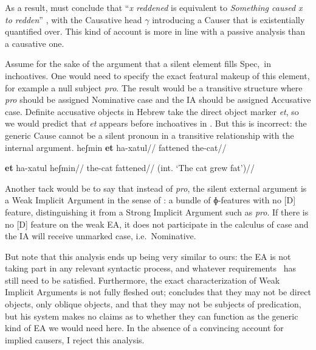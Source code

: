 As a result, \citeauthor{doron03} must conclude that ``\emph{x reddened} is equivalent to \emph{Something caused x to redden}'' \citep[62]{doron03}, with the Causative head $\gamma$ introducing a Causer that is existentially quantified over. This kind of account is more in line with a passive analysis than a causative one.

Assume for the sake of the argument that a silent element fills Spec,\vd~in inchoatives. One would need to specify the exact featural makeup of this element, for example a null subject \emph{pro}. The result would be a transitive structure where \emph{pro} should be assigned Nominative case and the IA should be assigned Accusative case. Definite accusative objects in Hebrew take the direct object marker \emph{et}, so we would predict that \emph{et} appears before inchoatives in \thif. But this is incorrect: the generic Cause cannot be a silent pronoun in a transitive relationship with the internal argument.
\pex
	\a \ljudge{*} \begingl
		\gla heʃmin \textbf{et} ha-xatul//
		\glb fattened  the-cat//
	\endgl
	
	\a \ljudge{*} \begingl
		\gla \textbf{et} ha-xatul heʃmin//
		\glb {} the-cat fattened//
		\glft (int. `The cat grew fat')//
	\endgl
\xe

Another tack would be to say that instead of \emph{pro}, the silent external argument is a Weak Implicit Argument in the sense of \cite{landau10}: a bundle of ɸ-features with no [D] feature, distinguishing it from a Strong Implicit Argument such as \emph{pro}. If there is no [D] feature on the weak EA, it does not participate in the calculus of case and the IA will receive unmarked case, i.e.~Nominative.

But note that this analysis ends up being very similar to ours: the EA is not taking part in any relevant syntactic process, and whatever requirements \vd~has still need to be satisfied. Furthermore, the exact characterization of Weak Implicit Arguments is not fully fleshed out; \citet[380]{landau10} concludes that they may not be direct objects, only oblique objects, and that they may not be subjects of predication, but his system makes no claims as to whether they can function as the generic kind of EA we would need here. In the absence of a convincing account for implied causers, I reject this analysis.

